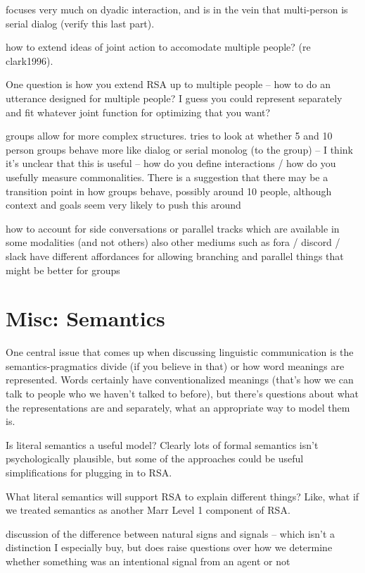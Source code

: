 \documentclass[]{article}
\begin{document}
\cite{clark1996} focuses very much on dyadic interaction, and is in the vein that multi-person is serial dialog (verify this last part). 

how to extend ideas of joint action to accomodate multiple people? (re clark1996). 

One question is how you extend RSA up to multiple people -- how to do an utterance designed for multiple people? I guess you could represent separately and fit whatever joint function for optimizing that you want? 

groups allow for more complex structures. \cite{fay2000} tries to look at whether 5 and 10 person groups behave more like dialog or serial monolog (to the group) -- I think it's unclear that this is useful -- how do you define interactions / how do you usefully measure commonalities. There is a suggestion that there may be a transition point in how groups behave, possibly around 10 people, although context and goals seem very likely to push this around 

how to account for side conversations or parallel tracks which are available in some modalities (and not others) also other mediums such as fora / discord / slack have different affordances for allowing branching and parallel things that might be better for groups 

\section{Misc: Semantics}
One central issue that comes up when discussing linguistic communication is the semantics-pragmatics divide (if you believe in that) or how word meanings are represented. Words certainly have conventionalized meanings (that's how we can talk to people who we haven't talked to before), but there's questions about what the representations are and separately, what an appropriate way to model them is. 

Is literal semantics a useful model? Clearly lots of formal semantics isn't psychologically plausible, but some of the approaches could be useful simplifications for plugging in to RSA. 

What literal semantics will support RSA to explain different things? Like, what if we treated semantics as another Marr Level 1 component of RSA. 

\cite{clark1996}
discussion of the difference between natural signs and signals -- which isn't a distinction I especially buy, but does raise questions over how we determine whether something was an intentional signal from an agent or not 
\end{document}
